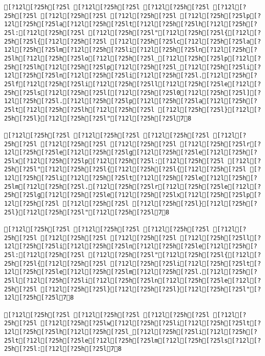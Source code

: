 \documentclass{scrartcl}
\begin{document}
\begin{Verbatim}
[?12l[?25h[?25l [?12l[?25h[?25l [?12l[?25h[?25l [?12l[?25h[?25l [?12l[?25h[?25l [?12l[?25h[?25l [?12l[?25h[?25lp[?12l[?25h[?25la[?12l[?25h[?25lt[?12l[?25h[?25lh[?12l[?25h[?25l:[?12l[?25h[?25l [?12l[?25h[?25l"[?12l[?25h[?25l{[?12l[?25h[?25l{[?12l[?25h[?25l [?12l[?25h[?25lc[?12l[?25h[?25la[?12l[?25h[?25lm[?12l[?25h[?25li[?12l[?25h[?25ln[?12l[?25h[?25lh[?12l[?25h[?25lo[?12l[?25h[?25l_[?12l[?25h[?25lp[?12l[?25h[?25lh[?12l[?25h[?25lp[?12l[?25h[?25l_[?12l[?25h[?25li[?12l[?25h[?25ln[?12l[?25h[?25li[?12l[?25h[?25l.[?12l[?25h[?25lf[?12l[?25h[?25li[?12l[?25h[?25ll[?12l[?25h[?25le[?12l[?25h[?25ls[?12l[?25h[?25l[[?12l[?25h[?25l0[?12l[?25h[?25l][?12l[?25h[?25l.[?12l[?25h[?25lp[?12l[?25h[?25la[?12l[?25h[?25lt[?12l[?25h[?25lh[?12l[?25h[?25l [?12l[?25h[?25l}[?12l[?25h[?25l}[?12l[?25h[?25l"[?12l[?25h[?25l78

[?12l[?25h[?25l [?12l[?25h[?25l [?12l[?25h[?25l [?12l[?25h[?25l [?12l[?25h[?25l [?12l[?25h[?25l [?12l[?25h[?25lr[?12l[?25h[?25le[?12l[?25h[?25lg[?12l[?25h[?25le[?12l[?25h[?25lx[?12l[?25h[?25lp[?12l[?25h[?25l:[?12l[?25h[?25l [?12l[?25h[?25l"[?12l[?25h[?25l{[?12l[?25h[?25l{[?12l[?25h[?25l [?12l[?25h[?25li[?12l[?25h[?25lt[?12l[?25h[?25le[?12l[?25h[?25lm[?12l[?25h[?25l.[?12l[?25h[?25lr[?12l[?25h[?25le[?12l[?25h[?25lg[?12l[?25h[?25le[?12l[?25h[?25lx[?12l[?25h[?25lp[?12l[?25h[?25l [?12l[?25h[?25l [?12l[?25h[?25l}[?12l[?25h[?25l}[?12l[?25h[?25l"[?12l[?25h[?25l78

[?12l[?25h[?25l [?12l[?25h[?25l [?12l[?25h[?25l [?12l[?25h[?25l [?12l[?25h[?25l [?12l[?25h[?25l [?12l[?25h[?25ll[?12l[?25h[?25li[?12l[?25h[?25ln[?12l[?25h[?25le[?12l[?25h[?25l:[?12l[?25h[?25l [?12l[?25h[?25l"[?12l[?25h[?25l{[?12l[?25h[?25l{[?12l[?25h[?25l [?12l[?25h[?25li[?12l[?25h[?25lt[?12l[?25h[?25le[?12l[?25h[?25lm[?12l[?25h[?25l.[?12l[?25h[?25ll[?12l[?25h[?25li[?12l[?25h[?25ln[?12l[?25h[?25le[?12l[?25h[?25l [?12l[?25h[?25l}[?12l[?25h[?25l}[?12l[?25h[?25l"[?12l[?25h[?25l78

[?12l[?25h[?25l [?12l[?25h[?25l [?12l[?25h[?25l [?12l[?25h[?25l [?12l[?25h[?25lw[?12l[?25h[?25li[?12l[?25h[?25lt[?12l[?25h[?25lh[?12l[?25h[?25l_[?12l[?25h[?25li[?12l[?25h[?25lt[?12l[?25h[?25le[?12l[?25h[?25lm[?12l[?25h[?25ls[?12l[?25h[?25l:[?12l[?25h[?25l78


\end{Verbatim}
\end{document}
